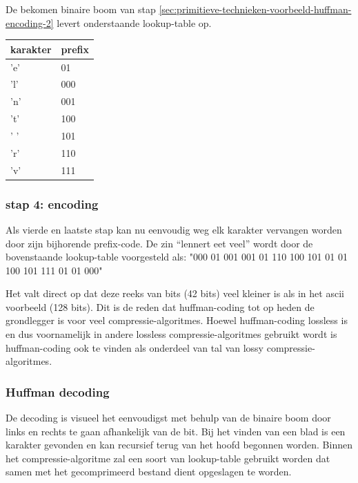 De bekomen binaire boom van stap \ref{sec:primitieve-technieken-voorbeeld-huffman-encoding-2} levert onderstaande \gls{lookup-table} op.

\FloatBarrier
\begin{table}[h!]
	\begin{tabular}{|l|l|}
		\hline
		\textbf{karakter} & \textbf{prefix} \\ \hline
		'e'               & 01              \\ \hline
		'l'               & 000             \\ \hline
		'n'               & 001             \\ \hline
		't'               & 100             \\ \hline
		' '               & 101             \\ \hline
		'r'               & 110             \\ \hline
		'v'               & 111             \\ \hline  
	\end{tabular}
\end{table}
\FloatBarrier

\subsubsection{stap 4: encoding}
\label{sec:primitieve-technieken-voorbeeld-huffman-encoding-4}
Als vierde en laatste stap kan nu eenvoudig weg elk karakter vervangen worden door zijn bijhorende \gls{prefix-code}. De zin “lennert eet veel” wordt door de bovenstaande \gls{lookup-table} voorgesteld als:
"000 01 001 001 01 110 100 101 01 01 100 101 111 01 01 000"

Het valt direct op dat deze reeks van \glspl{bit} (42 \glspl{bit}) veel kleiner is als in het \gls{ascii} voorbeeld (128 \glspl{bit}). Dit is de reden dat \gls{huffman-coding} tot op heden de grondlegger is voor veel \glspl{compressie-algoritme}. Hoewel \gls{huffman-coding} \gls{lossless} is en dus voornamelijk in andere \gls{lossless} \glspl{compressie-algoritme} gebruikt wordt is \gls{huffman-coding} ook te vinden als onderdeel van tal van \gls{lossy} \glspl{compressie-algoritme}.


\subsubsection{Huffman decoding}
\label{sec:primitieve-technieken-voorbeeld-huffman-decoding}
De \gls{decoding} is visueel het eenvoudigst met behulp van de binaire boom door links en rechts te gaan afhankelijk van de bit. Bij het vinden van een blad is een karakter gevonden en kan recursief terug van het hoofd begonnen worden. Binnen het \gls{compressie-algoritme} zal een soort van \gls{lookup-table} gebruikt worden dat samen met het gecomprimeerd bestand dient opgeslagen te worden.

